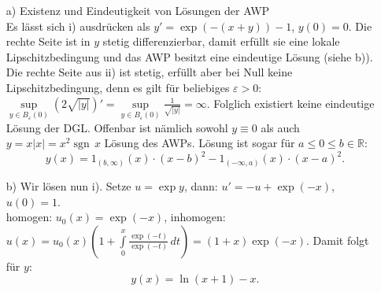 \documentclass[11pt]{article}
\theoremstyle{plain}
\theoremstyle{definition}
\theoremstyle{remark}
\newcommand{\R}{\mathbb{R}}
\newcommand{\ep}{\varepsilon}
\DeclareMathOperator{\sgn}{\mathrm{sgn}\,}
\begin{document}
\begin{itemize}
\item[a)] Existenz und Eindeutigkeit von Lösungen der AWP \\ 
Es lässt sich i) ausdrücken als $ y' = \exp(-(x+y))-1 $, $ y(0)=0 $. Die rechte Seite ist in $ y $ stetig differenzierbar, damit erfüllt sie eine lokale Lipschitzbedingung und das AWP besitzt eine eindeutige Lösung (siehe b)). \\ 
Die rechte Seite aus ii) ist stetig, erfüllt aber bei Null keine Lipschitzbedingung, denn es gilt für beliebiges $ \ep > 0 $: 
$ \underset{y\in B_\ep (0)}{\sup} (2\sqrt{|y|})' = \underset{y\in B_\ep (0)}{\sup} \frac{1}{\sqrt{|y|}} = \infty $. Folglich existiert keine eindeutige Lösung der DGL. Offenbar ist nämlich sowohl $ y \equiv 0 $ als auch $ y = x|x| = x^2\sgn x $ Lösung des AWPs. Lösung ist sogar für $ a \leq 0 \leq b \in \R $: 
\[ y(x) = 1_{(b,\infty)}(x) \cdot (x-b)^2 - 1_{(-\infty,a)}(x) \cdot (x-a)^2. \] 
\item[b)] 
Wir lösen nun i). Setze $ u = \exp y $, dann: $ u' = -u + \exp(-x) $, $ u(0)=1 $. \\ 
homogen: $ u_0 (x) = \exp(-x) $, 
inhomogen: $ u(x) = u_0 (x) \left(1+\int\limits_0^x \frac{\exp(-t)}{\exp(-t)} \, dt \right) = (1+x)\exp(-x) $. 
Damit folgt für $ y $: 
\[ y(x) = \ln(x+1)-x. \] 
\end{itemize}
\end{document}
